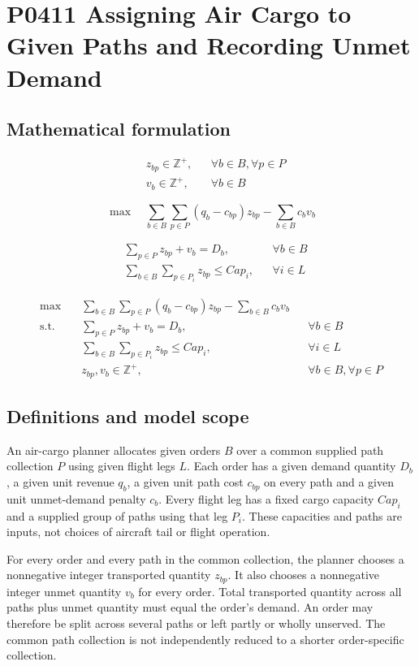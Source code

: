 \documentclass[10pt]{article}
\begin{document}
\section*{P0411 Assigning Air Cargo to Given Paths and Recording Unmet Demand}
\subsection*{Mathematical formulation}
\[
\begin{aligned}
& z_{bp} \in \mathbb{Z}^+, && \forall b \in B, \forall p \in P \\
& v_b \in \mathbb{Z}^+, && \forall b \in B
\end{aligned}
\]

\[
\max \quad \sum_{b \in B} \sum_{p \in P} (q_b - c_{bp}) z_{bp} - \sum_{b \in B} c_b v_b
\]

\[
\begin{aligned}
&\sum_{p \in P} z_{bp} + v_b = D_b, && \forall b \in B \\
&\sum_{b \in B} \sum_{p \in P_i} z_{bp} \le Cap_i, && \forall i \in L
\end{aligned}
\]

\[
\begin{aligned}
\max \quad & \sum_{b \in B} \sum_{p \in P} (q_b - c_{bp}) z_{bp} - \sum_{b \in B} c_b v_b \\
\text{s.t.} \quad & \sum_{p \in P} z_{bp} + v_b = D_b, && \forall b \in B \\
& \sum_{b \in B} \sum_{p \in P_i} z_{bp} \le Cap_i, && \forall i \in L \\
& z_{bp}, v_b \in \mathbb{Z}^+, && \forall b \in B, \forall p \in P
\end{aligned}
\]

\subsection*{Definitions and model scope}
An air-cargo planner allocates given orders $B$ over a common supplied path collection $P$ using given flight legs $L$. Each order has a given demand quantity $D_b$, a given unit revenue $q_b$, a given unit path cost $c_{bp}$ on every path and a given unit unmet-demand penalty $c_b$. Every flight leg has a fixed cargo capacity $Cap_i$ and a supplied group of paths using that leg $P_i$. These capacities and paths are inputs, not choices of aircraft tail or flight operation.

For every order and every path in the common collection, the planner chooses a nonnegative integer transported quantity $z_{bp}$. It also chooses a nonnegative integer unmet quantity $v_b$ for every order. Total transported quantity across all paths plus unmet quantity must equal the order's demand. An order may therefore be split across several paths or left partly or wholly unserved. The common path collection is not independently reduced to a shorter order-specific collection.
\end{document}
